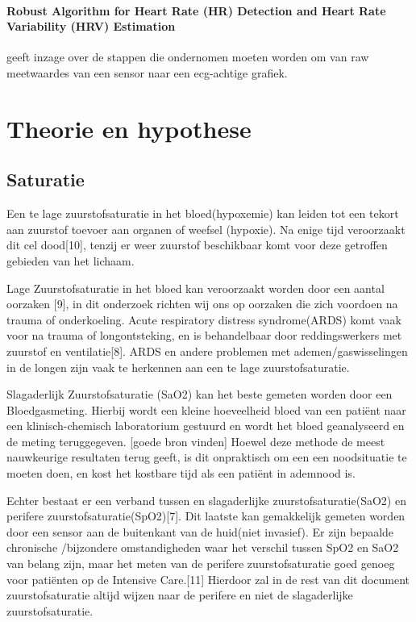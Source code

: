 \documentclass[11pt]{article}
\begin{document}
    \paragraph{Robust Algorithm for Heart Rate (HR) Detection and Heart Rate Variability (HRV) Estimation} geeft inzage over de stappen die ondernomen moeten worden om van raw meetwaardes van een sensor naar een ecg-achtige grafiek.

    \section{Theorie en hypothese}\label{sec:theorie-en-hypothese}
    \subsection{Saturatie}
    Een te lage zuurstofsaturatie in het bloed(hypoxemie) kan leiden tot een tekort aan zuurstof toevoer aan organen of weefsel (hypoxie).
    Na enige tijd veroorzaakt dit cel dood[10], tenzij er weer zuurstof beschikbaar komt voor deze getroffen gebieden van het lichaam.

    Lage Zuurstofsaturatie in het bloed kan veroorzaakt worden door een aantal oorzaken [9], in dit onderzoek richten wij ons op oorzaken die zich voordoen na trauma of onderkoeling.
    Acute respiratory distress syndrome(ARDS) komt vaak voor na trauma of longontsteking, en is behandelbaar door reddingswerkers met zuurstof en ventilatie[8]. 
    ARDS en andere problemen met ademen/gaswisselingen in de longen zijn vaak te herkennen aan een te lage zuurstofsaturatie.

    Slagaderlijk Zuurstofsaturatie (SaO2) kan het beste gemeten worden door een Bloedgasmeting. 
    Hierbij wordt een kleine hoeveelheid bloed van een patiënt naar een klinisch-chemisch laboratorium gestuurd en wordt het bloed geanalyseerd en de meting teruggegeven. 
    [goede bron vinden] Hoewel deze methode de meest nauwkeurige resultaten terug geeft, is dit onpraktisch om een een noodsituatie  te moeten doen, en kost het kostbare tijd als een patiënt in ademnood is.

    Echter bestaat er een verband tussen en slagaderlijke zuurstofsaturatie(SaO2) en perifere zuurstofsaturatie(SpO2)[7]. 
    Dit laatste kan gemakkelijk gemeten worden door een sensor aan de buitenkant van de huid(niet invasief). 
    Er zijn bepaalde chronische /bijzondere omstandigheden waar het verschil tussen SpO2 en SaO2 van belang zijn, maar het meten van de perifere zuurstofsaturatie goed genoeg voor patiënten op de Intensive Care.[11] 
    Hierdoor zal in de rest van dit document zuurstofsaturatie altijd wijzen naar de perifere en niet de slagaderlijke zuurstofsaturatie.
\end{document}
